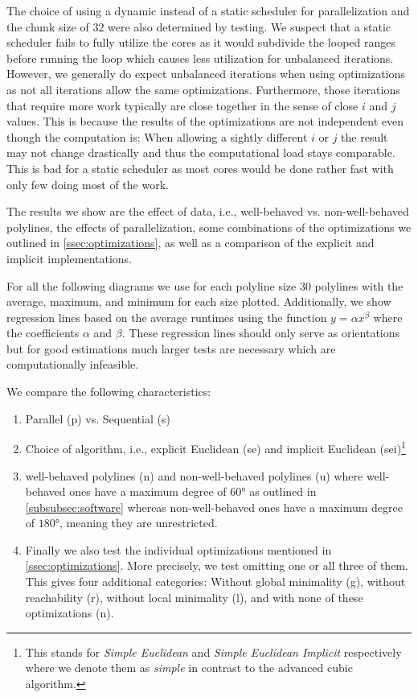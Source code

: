 The choice of using a dynamic instead of a static scheduler for parallelization and the chunk size of \(32\) were also determined by testing. We suspect that a static scheduler fails to fully utilize the cores as it would subdivide the looped ranges before running the loop which causes less utilization for unbalanced iterations. However, we generally do expect unbalanced iterations when using optimizations as not all iterations allow the same optimizations. Furthermore, those iterations that require more work typically are close together in the sense of close \(i\) and \(j\) values. This is because the results of the optimizations are not independent even though the computation is: When allowing a sightly different \(i\) or \(j\) the result may not change drastically and thus the computational load stays comparable. This is bad for a static scheduler as most cores would be done rather fast with only few doing most of the work. 

The results we show are the effect of data, i.e., well-behaved vs. non-well-behaved polylines, the effects of parallelization, some combinations of the optimizations we outlined in \cref{ssec:optimizations}, as well as a comparison of the explicit and implicit implementations. 

For all the following diagrams we use for each polyline size 30 polylines with the average, maximum, and minimum for each size plotted. Additionally, we show regression lines based on the average runtimes using the function \(y = \alpha x^\beta\) where the coefficients \(\alpha\) and \(\beta\). These regression lines should only serve as orientations but for good estimations much larger tests are necessary which are computationally infeasible.

We compare the following characteristics: 
\begin{enumerate}
  \item Parallel (p) vs. Sequential (s)
  \item Choice of algorithm, i.e., explicit Euclidean (se) and implicit Euclidean (sei)\footnote{This stands for \emph{Simple Euclidean} and \emph{Simple Euclidean Implicit} respectively where we denote them as \emph{simple} in contrast to the advanced cubic algorithm.}
  \item well-behaved polylines (n) and non-well-behaved polylines (u) where well-behaved ones have a maximum degree of \(60\)° as outlined in \cref{subsubsec:software} whereas non-well-behaved ones have a maximum degree of \(180\)°, meaning they are unrestricted. 
  \item Finally we also test the individual optimizations mentioned in \cref{ssec:optimizations}. More precisely, we test omitting one or all three of them. This gives four additional categories: Without global minimality (g), without reachability (r), without local minimality (l), and with none of these optimizations (n).
\end{enumerate}

